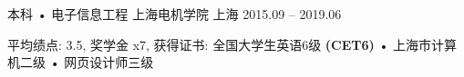 

\begin{cventries}

  \cventry
    { 本科 • 电子信息工程} %
    { 上海电机学院} %
    {上海} %
    {2015.09 -- 2019.06} %
    {
      \begin{cvitems} %
        \item {平均绩点: 3.5, 奖学金 x7, 获得证书: 全国大学生英语6级 \textbf{(CET6)} • 上海市计算机二级 • 网页设计师三级}
      \end{cvitems}
    }

\end{cventries}

